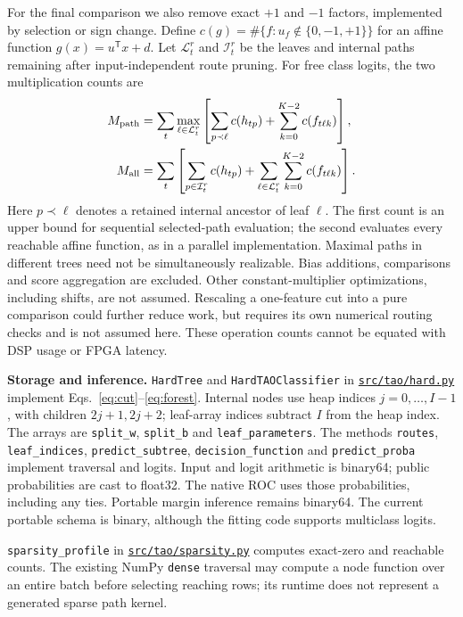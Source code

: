 \documentclass[11pt,a4paper]{article}
\newcommand{\code}[1]{{\small\texttt{\nolinkurl{#1}}}}
\newcommand{\file}[1]{\href{https://github.com/HephyAnalysisSW/oblique-tree-benchmark/blob/main/#1}{\nolinkurl{#1}}}
\begin{document}
For the final comparison we also remove exact $+1$ and $-1$ factors,
implemented by selection or sign change. Define
$c(g)=\#\{f:u_f\notin\{0,-1,+1\}\}$ for an affine function
$g(x)=u^{\mathsf T}x+d$. Let $\mathcal L_t^r$ and $\mathcal I_t^r$ be the
leaves and internal paths remaining after input-independent route pruning.
For free class logits, the two multiplication counts are
\begin{align}
 M_{\rm path}&=\sum_t\max_{\ell\in\mathcal L_t^r}
 \left[\sum_{p\prec\ell}c(h_{tp})+\sum_{k=0}^{K-2}c(f_{t\ell k})\right],\\
 M_{\rm all}&=\sum_t\left[\sum_{p\in\mathcal I_t^r}c(h_{tp})+
                 \sum_{\ell\in\mathcal L_t^r}\sum_{k=0}^{K-2}c(f_{t\ell k})\right].
 \label{eq:work-counts}
\end{align}
Here $p\prec\ell$ denotes a retained internal ancestor of leaf $\ell$.
The first count is an upper bound for sequential selected-path evaluation;
the second evaluates every reachable affine function, as in a parallel
implementation. Maximal paths in different trees need not be simultaneously
realizable. Bias additions, comparisons and score aggregation are excluded.
Other constant-multiplier optimizations, including shifts, are not assumed.
Rescaling a one-feature cut into a pure comparison could further reduce work,
but requires its own numerical routing checks and is not assumed here.
These operation counts cannot be equated with DSP usage or FPGA latency.

\begin{implementation}
\textbf{Storage and inference.} \code{HardTree} and \code{HardTAOClassifier}
in \file{src/tao/hard.py} implement Eqs.~\eqref{eq:cut}--\eqref{eq:forest}.
Internal nodes use heap indices $j=0,\ldots,I-1$, with children $2j+1,2j+2$;
leaf-array indices subtract $I$ from the heap index. The arrays are
\code{split_w}, \code{split_b} and \code{leaf_parameters}. The methods
\code{routes}, \code{leaf_indices}, \code{predict_subtree},
\code{decision_function} and \code{predict_proba} implement traversal and logits.
Input and logit arithmetic is binary64; public probabilities are cast to
float32. The native ROC uses those probabilities, including any ties. Portable
margin inference remains binary64. The current portable schema is binary,
although the fitting code supports multiclass logits.

\code{sparsity_profile} in \file{src/tao/sparsity.py} computes exact-zero and
reachable counts. The existing NumPy \code{dense} traversal may compute a
node function over an entire batch before selecting reaching rows; its runtime
does not represent a generated sparse path kernel.
\end{implementation}
\end{document}
